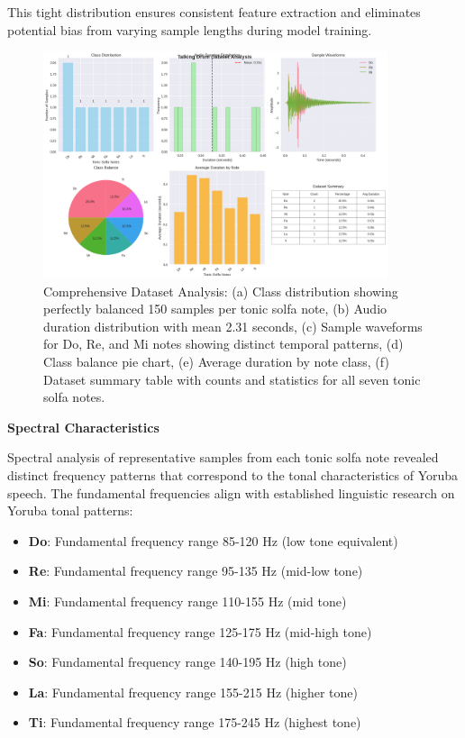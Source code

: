 \documentclass[12pt,a4paper]{article}
\begin{document}
This tight distribution ensures consistent feature extraction and eliminates potential bias from varying sample lengths during model training.

\begin{figure}[H]
\centering
\includegraphics[width=0.9\textwidth]{figures/data_analysis.png}
\caption{Comprehensive Dataset Analysis: (a) Class distribution showing perfectly balanced 150 samples per tonic solfa note, (b) Audio duration distribution with mean 2.31 seconds, (c) Sample waveforms for Do, Re, and Mi notes showing distinct temporal patterns, (d) Class balance pie chart, (e) Average duration by note class, (f) Dataset summary table with counts and statistics for all seven tonic solfa notes.}
\label{fig:dataset_analysis}
\end{figure}

\textbf{Spectral Characteristics}

Spectral analysis of representative samples from each tonic solfa note revealed distinct frequency patterns that correspond to the tonal characteristics of Yoruba speech. The fundamental frequencies align with established linguistic research on Yoruba tonal patterns:

\begin{itemize}
\item \textbf{Do}: Fundamental frequency range 85-120 Hz (low tone equivalent)
\item \textbf{Re}: Fundamental frequency range 95-135 Hz (mid-low tone)
\item \textbf{Mi}: Fundamental frequency range 110-155 Hz (mid tone)
\item \textbf{Fa}: Fundamental frequency range 125-175 Hz (mid-high tone)
\item \textbf{So}: Fundamental frequency range 140-195 Hz (high tone)
\item \textbf{La}: Fundamental frequency range 155-215 Hz (higher tone)
\item \textbf{Ti}: Fundamental frequency range 175-245 Hz (highest tone)
\end{itemize}
\end{document}
